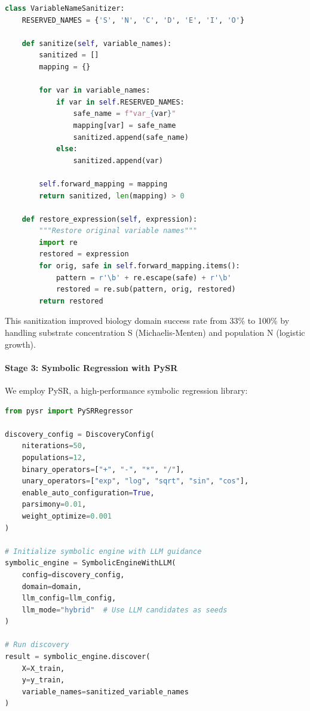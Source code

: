\documentclass[twoside,11pt]{article}
\begin{document}
\begin{lstlisting}[language=Python, caption=Variable Name Sanitization]
class VariableNameSanitizer:
    RESERVED_NAMES = {'S', 'N', 'C', 'D', 'E', 'I', 'O'}

    def sanitize(self, variable_names):
        sanitized = []
        mapping = {}

        for var in variable_names:
            if var in self.RESERVED_NAMES:
                safe_name = f"var_{var}"
                mapping[var] = safe_name
                sanitized.append(safe_name)
            else:
                sanitized.append(var)

        self.forward_mapping = mapping
        return sanitized, len(mapping) > 0

    def restore_expression(self, expression):
        """Restore original variable names"""
        import re
        restored = expression
        for orig, safe in self.forward_mapping.items():
            pattern = r'\b' + re.escape(safe) + r'\b'
            restored = re.sub(pattern, orig, restored)
        return restored
\end{lstlisting}

This sanitization improved biology domain success rate from 33\% to 100\% by handling substrate concentration S (Michaelis-Menten) and population N (logistic growth).


\paragraph{Stage 3: Symbolic Regression with PySR}

We employ PySR, a high-performance symbolic regression library:

\begin{lstlisting}[language=Python, caption=Symbolic Regression Configuration]
from pysr import PySRRegressor

discovery_config = DiscoveryConfig(
    niterations=50,
    populations=12,
    binary_operators=["+", "-", "*", "/"],
    unary_operators=["exp", "log", "sqrt", "sin", "cos"],
    enable_auto_configuration=True,
    parsimony=0.01,
    weight_optimize=0.001
)

# Initialize symbolic engine with LLM guidance
symbolic_engine = SymbolicEngineWithLLM(
    config=discovery_config,
    domain=domain,
    llm_config=llm_config,
    llm_mode="hybrid"  # Use LLM candidates as seeds
)

# Run discovery
result = symbolic_engine.discover(
    X=X_train,
    y=y_train,
    variable_names=sanitized_variable_names
)
\end{lstlisting}
\end{document}
